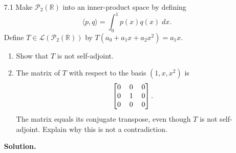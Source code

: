 \documentclass[9pt]{article}
\newcommand{\R}{\mathbb{R}}
\newcommand{\cyc}[1]{\langle #1 \rangle}
\begin{document}
\begin{enumerate}
   \item[7.1]  Make $\mathcal{P}_2(\R)$ into an inner-product space by defining
               $$\cyc{p, q} = \int_0^1p(x)q(x)\;dx.$$
               Define $T \in \mathcal{L}(\mathcal{P}_2(\R))$ by
               $T(a_0 + a_1x + a_2x^2) = a_1x$.
               \begin{enumerate}
                  \item Show that $T$ is not self-adjoint.
                  \item The matrix of $T$ with respect to the basis
                        $(1, x, x^2)$ is
                        $$\left[\begin{tabular}{@{}c c c@{}}
                           0 & 0 & 0 \\
                           0 & 1 & 0 \\
                           0 & 0 & 0
                        \end{tabular}\right].$$
                        The matrix equals its conjugate transpose, even though
                        $T$ is not self-adjoint. Explain why this is not a
                        contradiction.
               \end{enumerate}
               
      \textbf{Solution.}
      

\end{enumerate}
\end{document}

